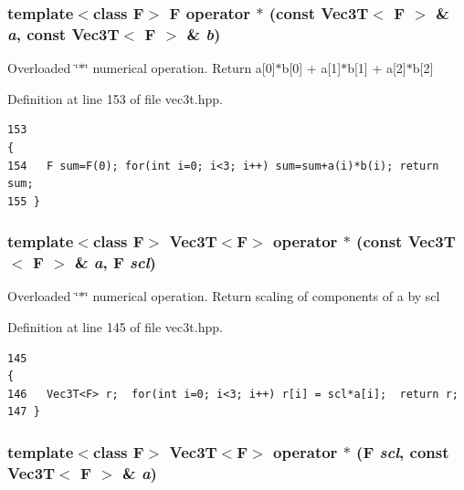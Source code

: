 \subsubsection{\setlength{\rightskip}{0pt plus 5cm}template$<$class F$>$ F operator $\ast$ (const {\bf Vec3T}$<$ F $>$ \& {\em a}, const {\bf Vec3T}$<$ F $>$ \& {\em b})\hspace{0.3cm}{\tt  [inline]}}\label{vec3t_8hpp_33d8e44311db4b369b0bdc100a044766_33d8e44311db4b369b0bdc100a044766}


Overloaded \char`\"{}$\ast$\char`\"{} numerical operation. Return a[0]$\ast$b[0] + a[1]$\ast$b[1] + a[2]$\ast$b[2] 

Definition at line 153 of file vec3t.hpp.

\footnotesize\begin{verbatim}153                                                                              {
154   F sum=F(0); for(int i=0; i<3; i++) sum=sum+a(i)*b(i); return sum;
155 }
\end{verbatim}\normalsize 


\subsubsection{\setlength{\rightskip}{0pt plus 5cm}template$<$class F$>$ {\bf Vec3T}$<$F$>$ operator $\ast$ (const {\bf Vec3T}$<$ F $>$ \& {\em a}, F {\em scl})\hspace{0.3cm}{\tt  [inline]}}\label{vec3t_8hpp_074611abb9400003a042d0a3acf7878e_074611abb9400003a042d0a3acf7878e}


Overloaded \char`\"{}$\ast$\char`\"{} numerical operation. Return scaling of components of a by scl 

Definition at line 145 of file vec3t.hpp.

\footnotesize\begin{verbatim}145                                                                         {
146   Vec3T<F> r;  for(int i=0; i<3; i++) r[i] = scl*a[i];  return r;
147 }
\end{verbatim}\normalsize 


\subsubsection{\setlength{\rightskip}{0pt plus 5cm}template$<$class F$>$ {\bf Vec3T}$<$F$>$ operator $\ast$ (F {\em scl}, const {\bf Vec3T}$<$ F $>$ \& {\em a})\hspace{0.3cm}{\tt  [inline]}}\label{vec3t_8hpp_8395089d3dc67e3124a0aaca1a65a3fd_8395089d3dc67e3124a0aaca1a65a3fd}



